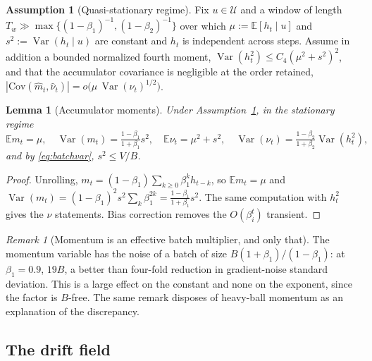 \documentclass{article}
\theoremstyle{plain}
\newtheorem{lemma}{Lemma}
\theoremstyle{definition}
\newtheorem{assumption}{Assumption}
\theoremstyle{remark}
\newtheorem{remark}{Remark}
\newcommand{\E}{\mathbb{E}}
\newcommand{\Var}{\operatorname{Var}}
\newcommand{\1}{\mathbf{1}}
\newcommand{\cU}{\mathcal{U}}
\begin{document}
\begin{assumption}[Quasi-stationary regime]
\label{ass:qs}
Fix $u\in\cU$ and a window of length
$T_w\gg\max\{(1-\beta_1)^{-1},(1-\beta_2)^{-1}\}$ over which
$\mu := \E[h_t\mid u]$ and $s^2 := \Var(h_t\mid u)$ are constant and $h_t$ is
independent across steps. Assume in addition a bounded normalized fourth moment,
$\Var(h_t^2)\le C_4(\mu^2+s^2)^2$, and that the accumulator covariance is
negligible at the order retained,
$|\mathrm{Cov}(\hat m_t,\hat\nu_t)| = o\big(\mu\,\Var(\hat\nu_t)^{1/2}\big)$.
\end{assumption}

\begin{lemma}[Accumulator moments]
\label{lem:adammoments}
Under Assumption~\ref{ass:qs}, in the stationary regime
\begin{equation}
\label{eq:adammoments}
\E m_t = \mu,\quad
\Var(m_t) = \tfrac{1-\beta_1}{1+\beta_1}s^2,\quad
\E \nu_t = \mu^2 + s^2,\quad
\Var(\nu_t) = \tfrac{1-\beta_2}{1+\beta_2}\Var(h_t^2),
\end{equation}
and by \eqref{eq:batchvar}, $s^2\le V/B$.
\end{lemma}

\begin{proof}
Unrolling, $m_t = (1-\beta_1)\sum_{k\ge0}\beta_1^kh_{t-k}$, so $\E m_t = \mu$ and
$\Var(m_t) = (1-\beta_1)^2s^2\sum_k\beta_1^{2k} =
\frac{1-\beta_1}{1+\beta_1}s^2$. The same computation with $h_t^2$ gives the
$\nu$ statements. Bias correction removes the $O(\beta_i^t)$ transient.
\end{proof}

\begin{remark}[Momentum is an effective batch multiplier, and only that]
\label{rem:momentum}
The momentum variable has the noise of a batch of size
$B(1+\beta_1)/(1-\beta_1)$: at $\beta_1 = 0.9$, $19B$, a better than four-fold
reduction in gradient-noise standard deviation. This is a large effect on the
constant and none on the exponent, since the factor is $B$-free. The same remark
disposes of heavy-ball momentum as an explanation of the discrepancy.
\end{remark}

\subsection{The drift field}
\end{document}
